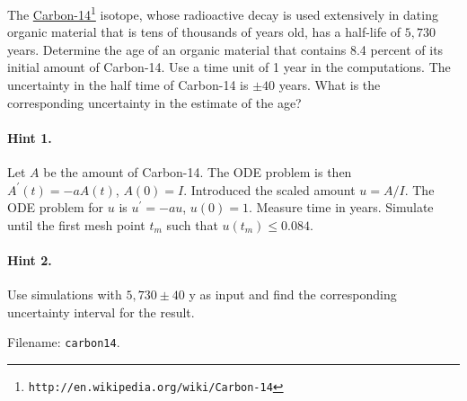 \documentclass[graybox,sectrefs,envcountresetchap,open=right,final]{svmonodo}
\makeatletter
\newenvironment{doconceexercise}{}{}
\newcounter{doconceexercisecounter}%
\newcommand\listofexercises{
\chapter*{List of Exercises, Problems, and Projects
          \@mkboth{List of Exercises, Problems, and Projects}{List of Exercises, Problems, and Projects}}
\markboth{List of Exercises, Problems, and Projects}{List of Exercises, Problems, and Projects}
\@starttoc{loe}
}
\makeatother
\begin{document}
\begin{doconceexercise}

                
\label{decay:app:exer:radio:C14}

The \href{{http://en.wikipedia.org/wiki/Carbon-14}}{Carbon-14}\footnote{\texttt{http://en.wikipedia.org/wiki/Carbon-14}} isotope,
whose radioactive decay is used extensively in dating organic material
that is tens of thousands of years old, has a half-life of $5,730$
years.  Determine the age of an organic material that contains 8.4 percent
of its initial amount of Carbon-14.  Use a time unit of 1 year in the
computations.  The uncertainty in the half time of Carbon-14 is $\pm
40$ years.  What is the corresponding uncertainty in the estimate of
the age?


\paragraph{Hint 1.}
Let $A$ be the amount of Carbon-14. The ODE problem is then
$A^{\prime}(t)=-aA(t)$, $A(0)=I$. Introduced the scaled amount
$u=A/I$. The ODE problem for $u$ is $u^{\prime}=-au$, $u(0)=1$.
Measure time in years.
Simulate until the first mesh point $t_m$ such that $u(t_m)\leq 0.084$.



\paragraph{Hint 2.}
Use simulations with $5,730\pm 40$ y as input
and find the corresponding uncertainty interval for the result.


\noindent Filename: \texttt{carbon14}.

\end{doconceexercise}
\end{document}
